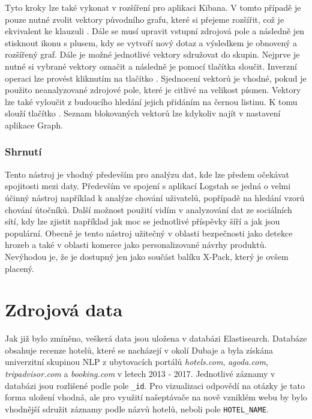 \documentclass[czech,BP]{thesiskiv}
\begin{document}
Tyto kroky lze také vykonat v rozšíření pro aplikaci Kibana. V tomto případě je pouze nutné zvolit vektory původního grafu, které si přejeme rozšířit, což je ekvivalent ke klauzuli \textbf{}. Dále se musí upravit vstupní zdrojová pole a následně jen stisknout ikonu s plusem, kdy se vytvoří nový dotaz a výsledkem je obnovený a rozšířený graf. Dále je možné jednotlivé vektory sdružovat do skupin. Nejprve je nutné si vybrané vektory označit a následně je pomocí tlačítka \textbf{} sloučit. Inverzní operaci lze provést kliknutím na tlačítko \textbf{}. Sjednocení vektorů je vhodné, pokud je použito neanalyzované zdrojové pole, které je citlivé na velikost písmen. Vektory lze také vyloučit z budoucího hledání jejich přidáním na černou listinu. K tomu slouží tlačítko . Seznam blokovaných vektorů lze kdykoliv najít v nastavení aplikace Graph.

\subsection{Shrnutí}
Tento nástroj je vhodný především pro analýzu dat, kde lze předem očekávat spojitosti mezi daty. Především ve spojení s aplikací Logstah se jedná o velmi účinný nástroj například k analýze chování uživatelů, popřípadě na hledání vzorů chování útočníků. Další možnost použití vidím v analyzování dat ze sociálních sítí, kdy lze zjistit například jak moc se jednotlivé příspěvky šíří a jak jsou populární. Obecně je tento nástroj užitečný v oblasti bezpečnosti jako detekce hrozeb a také v oblasti komerce jako personalizované návrhy produktů. Nevýhodou je, že je dostupný jen jako součást balíku X-Pack, který je ovšem placený.

\chapter{Zdrojová data}
Jak již bylo zmíněno, veškerá data jsou uložena v databázi Elastisearch. Databáze obsahuje recenze hotelů, které se nacházejí v okolí Dubaje a byla získána univerzitní skupinou NLP z ubytovacích portálů \textit{hotels.com}, \textit{ago\-da.com}, \textit{tripadvisor.com} a \textit{booking.com} v letech 2013 - 2017. Jednotlivé záznamy v databázi jsou rozlišené podle pole \texttt{\_id}. Pro vizualizaci odpovědí na otázky je tato forma uložení vhodná, ale pro využití našeptávače na nově vzniklém  webu by bylo vhodnější sdružit záznamy podle názvů hotelů, neboli pole \texttt{HOTEL\_NAME}.
\end{document}

